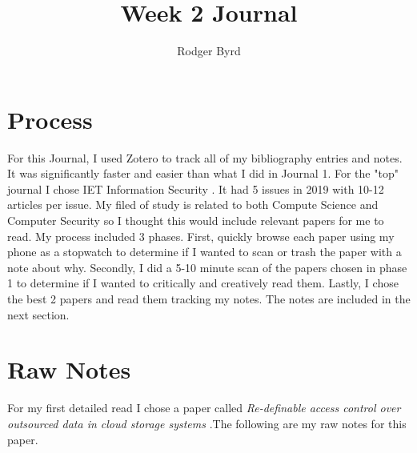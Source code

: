 \documentclass[conference]{IEEEtran}
\begin{document}

\title{Week 2 Journal}
\author{Rodger Byrd}
\maketitle


\section{Process}

For this Journal, I used Zotero to track all of my bibliography entries and notes. It was significantly faster and easier than what I did in Journal 1. 
For the "top" journal I chose IET Information Security \cite{noauthor_iet_nodate}. It had 5 issues in 2019 with 10-12 articles per issue. My filed of study is related to both Compute Science and Computer Security so I thought this would include relevant papers for me to read. My process included 3 phases. 
First, quickly browse each paper using my phone as a stopwatch to determine if I wanted to scan or trash the paper with a note about why.
Secondly, I did a 5-10 minute scan of the papers chosen in phase 1 to determine if I wanted to critically and creatively read them.
Lastly, I chose the best 2 papers and read them tracking my notes. The notes are included in the next section.

\section{Raw Notes}
For my first detailed read I chose a paper called  \textit{Re-definable access control over outsourced data in cloud storage systems} \cite{zhang_re-definable_2019}.The following are my raw notes for this paper.
\end{document}
